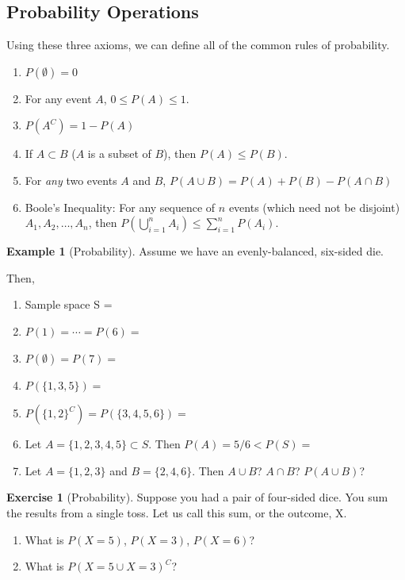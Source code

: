 \documentclass[
]{book}
\providecommand{\tightlist}{%
  \setlength{\itemsep}{0pt}\setlength{\parskip}{0pt}}
\theoremstyle{definition}
\theoremstyle{definition}
\newtheorem{example}{Example}[chapter]
\theoremstyle{definition}
\newtheorem{exercise}{Exercise}[chapter]
\theoremstyle{remark}
\begin{document}
\hypertarget{probability-operations}{%
\subsection*{Probability Operations}\label{probability-operations}}

Using these three axioms, we can define all of the common rules of probability.

\begin{enumerate}
\def\labelenumi{\arabic{enumi}.}
\tightlist
\item
  \(P(\emptyset)=0\)
\item
  For any event \(A\), \(0\le P(A) \le 1\).
\item
  \(P({A}^C)=1-P(A)\)
\item
  If \(A\subset B\) (\(A\) is a subset of \(B\)), then \(P(A)\le P(B)\).
\item
  For \emph{any} two events \(A\) and \(B\), \(P(A\cup B)=P(A)+P(B)-P(A\cap B)\)
\item
  Boole's Inequality: For any sequence of \(n\) events (which need not be disjoint) \(A_1,A_2,\ldots,A_n\), then \(P\left( \bigcup\limits_{i=1}^n A_i\right) \leq \sum\limits_{i=1}^n P(A_i)\).
\end{enumerate}

\begin{example}[Probability]
\protect\hypertarget{exm:prob}{}{\label{exm:prob} {} }
Assume we have an evenly-balanced, six-sided die.

Then,

\begin{enumerate}
\def\labelenumi{\arabic{enumi}.}
\tightlist
\item
  Sample space S =
\item
  \(P(1)=\cdots=P(6)=\)
\item
  \(P(\emptyset)=P(7)=\)
\item
  \(P\left( \{ 1, 3, 5 \} \right)=\)
\item
  \(P\left( \{ 1, 2 \}^C \right)= P\left( \{ 3, 4, 5, 6 \}\right)=\)
\item
  Let \(A=\{ 1,2,3,4,5 \}\subset S\). Then \(P(A)=5/6<P(S)=\)
\item
  Let \(A=\{ 1, 2, 3 \}\) and \(B=\{ 2, 4, 6 \}\). Then \(A\cup B\)? \(A\cap B\)? \(P(A \cup B)\)?
\end{enumerate}
\end{example}

\begin{exercise}[Probability]
\protect\hypertarget{exr:prob1}{}{\label{exr:prob1} {} }
Suppose you had a pair of four-sided dice. You sum the results from a single toss. Let us call this sum, or the outcome, X.

\begin{enumerate}
\def\labelenumi{\arabic{enumi}.}
\item
  What is \(P(X = 5)\), \(P(X = 3)\), \(P(X = 6)\)?
\item
  What is \(P(X=5 \cup X = 3)^C\)?
\end{enumerate}
\end{exercise}
\end{document}
